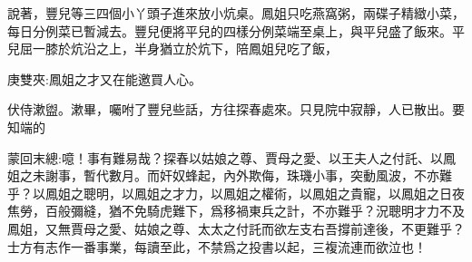 \begin{parag}
    說著，豐兒等三四個小丫頭子進來放小炕桌。鳳姐只吃燕窩粥，兩碟子精緻小菜，每日分例菜已暫減去。豐兒便將平兒的四樣分例菜端至桌上，與平兒盛了飯來。平兒屈一膝於炕沿之上，半身猶立於炕下，陪鳳姐兒吃了飯，\begin{note}庚雙夾:鳳姐之才又在能邀買人心。\end{note}伏侍漱盥。漱畢，囑咐了豐兒些話，方往探春處來。只見院中寂靜，人已散出。要知端的
\end{parag}


\begin{parag}
    \begin{note}蒙回末總:噫！事有難易哉？探春以姑娘之尊、賈母之愛、以王夫人之付託、以鳳姐之未謝事，暫代數月。而奸奴蜂起，內外欺侮，珠璣小事，突動風波，不亦難乎？以鳳姐之聰明，以鳳姐之才力，以鳳姐之權術，以鳳姐之貴寵，以鳳姐之日夜焦勞，百般彌縫，猶不免騎虎難下，爲移禍東兵之計，不亦難乎？況聰明才力不及鳳姐，又無賈母之愛、姑娘之尊、太太之付託而欲左支右吾撐前達後，不更難乎？士方有志作一番事業，每讀至此，不禁爲之投書以起，三複流連而欲泣也！\end{note}
\end{parag}
